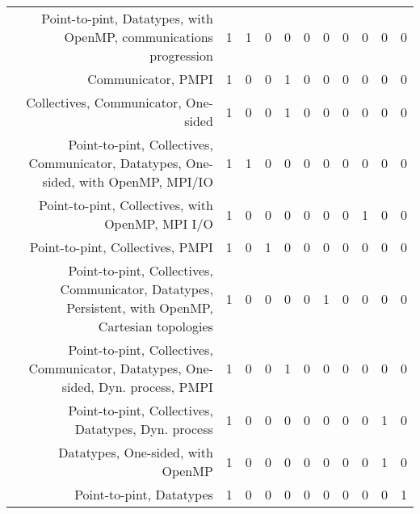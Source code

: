 {\begin{landscape}
\begin{longtable}[htb]{r|c|c|c|c|c|c|c|c|c|c}
{Point-to-pint, Datatypes, with OpenMP, communications progression} & 1 & 1 & 0 & 0 & 0 & 0 & 0 & 0 & 0 & 0 \\%
{Communicator, PMPI} & 1 & 0 & 0 & 1 & 0 & 0 & 0 & 0 & 0 & 0 \\%
{Collectives, Communicator, One-sided} & 1 & 0 & 0 & 1 & 0 & 0 & 0 & 0 & 0 & 0 \\%
{Point-to-pint, Collectives, Communicator, Datatypes, One-sided, with OpenMP, MPI/IO} & 1 & 1 & 0 & 0 & 0 & 0 & 0 & 0 & 0 & 0 \\%
{Point-to-pint, Collectives, with OpenMP, MPI I/O} & 1 & 0 & 0 & 0 & 0 & 0 & 0 & 1 & 0 & 0 \\%
{Point-to-pint, Collectives, PMPI} & 1 & 0 & 1 & 0 & 0 & 0 & 0 & 0 & 0 & 0 \\%
{Point-to-pint, Collectives, Communicator, Datatypes, Persistent, with OpenMP, Cartesian topologies} & 1 & 0 & 0 & 0 & 0 & 1 & 0 & 0 & 0 & 0 \\%
{Point-to-pint, Collectives, Communicator, Datatypes, One-sided, Dyn. process, PMPI} & 1 & 0 & 0 & 1 & 0 & 0 & 0 & 0 & 0 & 0 \\%
{Point-to-pint, Collectives, Datatypes, Dyn. process} & 1 & 0 & 0 & 0 & 0 & 0 & 0 & 0 & 1 & 0 \\%
{Datatypes, One-sided, with OpenMP} & 1 & 0 & 0 & 0 & 0 & 0 & 0 & 0 & 1 & 0 \\%
{Point-to-pint, Datatypes} & 1 & 0 & 0 & 0 & 0 & 0 & 0 & 0 & 0 & 1 \\%
\hline%
\end{longtable}%
\end{landscape}}%
\clearpage%
